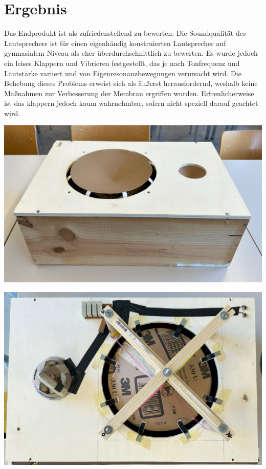 \documentclass[a4paper,11pt]{report}
\begin{document}
\section{Ergebnis}
Das Endprodukt ist als zufriedenstellend zu bewerten. Die Soundqualität des Lautsprechers ist für einen eigenhändig konstruierten Lautsprecher auf gymnasialem Niveau als eher überdurchschnittlich zu bewerten. Es wurde jedoch ein leises Klappern und Vibrieren festgestellt, das je nach Tonfrequenz und Lautstärke variiert und von Eigenresonanzbewegungen verursacht wird. Die Behebung dieses Problems erweist sich als äußerst herausfordernd, weshalb keine Maßnahmen zur Verbesserung der Membran ergriffen wurden. Erfreulicherweise ist das klappern jedoch kaum wahrnehmbar, sofern nicht speziell darauf geachtet wird. 

\begin{minipage}{0.5\textwidth}
    \centering
    \includegraphics[width=.8\linewidth]{resources/images/Fotos/Physik-131.jpg}
    \label{fig:total}
\end{minipage}
\begin{minipage}{0.5\textwidth}
    \centering
    \includegraphics[width=.8\linewidth]{resources/images/Fotos/Physik-121.jpg}
    \label{fig:plate_top}
\end{minipage}
\end{document}
